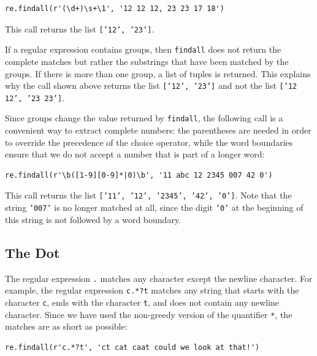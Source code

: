 \begin{verbatim}
re.findall(r'(\d+)\s+\1', '12 12 12, 23 23 17 18')
\end{verbatim}

\noindent
This call returns the list \texttt{['12', '23']}.

\remarkEng
If a regular expression contains groups, then \texttt{findall} does not return the complete matches but rather
the substrings that have been matched by the groups.  If there is more than one group, a list of tuples is
returned.  This explains why the call shown above returns the list \texttt{['12', '23']} and not the list
\texttt{['12 12', '23 23']}.
\eox

\noindent
Since groups change the value returned by \texttt{findall}, the following call is a convenient way to extract
complete numbers: the parentheses are needed in order to override the precedence of the choice operator, while
the word boundaries ensure that we do not accept a number that is part of a longer word:

\begin{verbatim}
re.findall(r'\b([1-9][0-9]*|0)\b', '11 abc 12 2345 007 42 0')
\end{verbatim}

\noindent
This call returns the list \texttt{['11', '12', '2345', '42', '0']}.  Note that the string \texttt{'007'} is no
longer matched at all, since the digit \texttt{'0'} at the beginning of this string is not followed by a word
boundary.

\subsection{The Dot}
The regular expression \texttt{.} matches any character except the newline character.  For example, the regular
expression \texttt{c.*?t} matches any string that starts with the character \texttt{c}, ends with the character
\texttt{t}, and does not contain any newline character.  Since we have used the non-greedy version of the
quantifier \texttt{*}, the matches are as short as possible:

\begin{verbatim}
re.findall(r'c.*?t', 'ct cat caat could we look at that!')
\end{verbatim}

